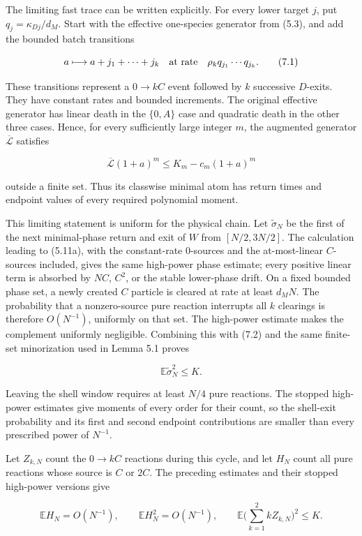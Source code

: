 The limiting fast trace can be written explicitly. For every lower
target \(j\), put \(q_j=\kappa_{Dj}/d_M\). Start with the effective
one-species generator from (5.3), and add the bounded batch transitions

\[
 a\longmapsto a+j_1+\cdots+j_k
 \quad\hbox{at rate}\quad
 \rho_kq_{j_1}\cdots q_{j_k}.
\tag{7.1}
\]

These transitions represent a \(0\to kC\) event followed by \(k\)
successive \(D\)-exits. They have constant rates and bounded increments.
The original effective generator has linear death in the \(\{0,A\}\)
case and quadratic death in the other three cases. Hence, for every
sufficiently large integer \(m\), the augmented generator
\(\overline{\mathcal L}\) satisfies

\[
 \overline{\mathcal L}(1+a)^m\le K_m-c_m(1+a)^m
\tag{7.2}
\]

outside a finite set. Thus its classwise minimal atom has return times
and endpoint values of every required polynomial moment.

This limiting statement is uniform for the physical chain. Let
\(\widetilde\sigma_N\) be the first of the next minimal-phase return and
exit of \(W\) from \([N/2,3N/2]\). The calculation leading to (5.11a),
with the constant-rate \(0\)-sources and the at-most-linear
\(C\)-sources included, gives the same high-power phase estimate; every
positive linear term is absorbed by \(NC\), \(C^2\), or the stable
lower-phase drift. On a fixed bounded phase set, a newly created \(C\)
particle is cleared at rate at least \(d_MN\). The probability that a
nonzero-source pure reaction interrupts all \(k\) clearings is therefore
\(O(N^{-1})\), uniformly on that set. The high-power estimate makes the
complement uniformly negligible. Combining this with (7.2) and the same
finite-set minorization used in Lemma 5.1 proves

\[
 \mathbb E\widetilde\sigma_N^2\le K.
\tag{7.3}
\]

Leaving the shell window requires at least \(N/4\) pure reactions. The
stopped high-power estimates give moments of every order for their
count, so the shell-exit probability and its first and second endpoint
contributions are smaller than every prescribed power of \(N^{-1}\).

Let \(Z_{k,N}\) count the \(0\to kC\) reactions during this cycle, and
let \(H_N\) count all pure reactions whose source is \(C\) or \(2C\).
The preceding estimates and their stopped high-power versions give

\[
 \mathbb EH_N=O(N^{-1}),\qquad
 \mathbb EH_N^2=O(N^{-1}),\qquad
 \mathbb E\Big(\sum_{k=1}^2 kZ_{k,N}\Big)^2\le K.
\tag{7.4}
\]

